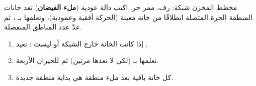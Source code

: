 \begin{statement}
مخطط المخزن شبكة: \code{\#} رف،  ممر حر. اكتب دالة عودية  (\textbf{ملء الفيضان}) تعد خانات المنطقة الحرة المتصلة انطلاقًا من خانة معينة (الحركة أفقية وعمودية)، وتعلمها بـ ، ثم عدّ عدد المناطق المنفصلة.
\end{statement}
\begin{stepsbox}\begin{enumerate}
\item إذا كانت الخانة خارج الشبكة أو ليست : نعيد .
\item نعلمها بـ  (لكي لا نعدها مرتين) ثم  للجيران الأربعة.
\item كل خانة  باقية بعد ملء منطقة هي بداية منطقة جديدة.
\end{enumerate}\end{stepsbox}
